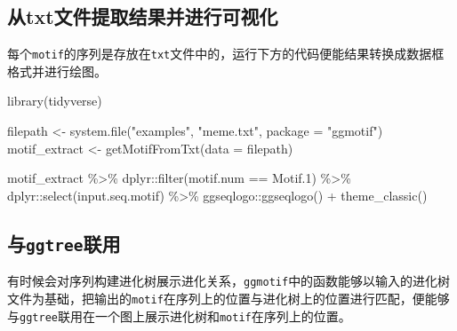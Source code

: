 \documentclass[
  10pt,
]{book}
\newenvironment{Shaded}{\begin{snugshade}}{\end{snugshade}}
\newcommand{\AttributeTok}[1]{\textcolor[rgb]{0.77,0.63,0.00}{#1}}
\newcommand{\FunctionTok}[1]{\textcolor[rgb]{0.00,0.00,0.00}{#1}}
\newcommand{\NormalTok}[1]{#1}
\newcommand{\OtherTok}[1]{\textcolor[rgb]{0.56,0.35,0.01}{#1}}
\newcommand{\SpecialCharTok}[1]{\textcolor[rgb]{0.00,0.00,0.00}{#1}}
\newcommand{\StringTok}[1]{\textcolor[rgb]{0.31,0.60,0.02}{#1}}
\begin{document}
\hypertarget{ux4ecetxtux6587ux4ef6ux63d0ux53d6ux7ed3ux679cux5e76ux8fdbux884cux53efux89c6ux5316}{%
\subsection{从txt文件提取结果并进行可视化}\label{ux4ecetxtux6587ux4ef6ux63d0ux53d6ux7ed3ux679cux5e76ux8fdbux884cux53efux89c6ux5316}}

每个\texttt{motif}的序列是存放在\texttt{txt}文件中的，运行下方的代码便能结果转换成数据框格式并进行绘图。

\begin{Shaded}
\begin{Highlighting}[]
\FunctionTok{library}\NormalTok{(tidyverse)}

\NormalTok{filepath }\OtherTok{\textless{}{-}} \FunctionTok{system.file}\NormalTok{(}\StringTok{"examples"}\NormalTok{, }\StringTok{"meme.txt"}\NormalTok{, }\AttributeTok{package =} \StringTok{"ggmotif"}\NormalTok{)}
\NormalTok{motif\_extract }\OtherTok{\textless{}{-}} \FunctionTok{getMotifFromTxt}\NormalTok{(}\AttributeTok{data =}\NormalTok{ filepath)}

\NormalTok{motif\_extract }\SpecialCharTok{\%\textgreater{}\%} 
\NormalTok{  dplyr}\SpecialCharTok{::}\FunctionTok{filter}\NormalTok{(motif.num }\SpecialCharTok{==} \StringTok{\textquotesingle{}Motif.1\textquotesingle{}}\NormalTok{) }\SpecialCharTok{\%\textgreater{}\%} 
\NormalTok{  dplyr}\SpecialCharTok{::}\FunctionTok{select}\NormalTok{(input.seq.motif) }\SpecialCharTok{\%\textgreater{}\%} 
\NormalTok{  ggseqlogo}\SpecialCharTok{::}\FunctionTok{ggseqlogo}\NormalTok{() }\SpecialCharTok{+}
  \FunctionTok{theme\_classic}\NormalTok{()}
\end{Highlighting}
\end{Shaded}

\hypertarget{ux4e0eggtreeux8054ux7528}{%
\subsection{\texorpdfstring{与\texttt{ggtree}联用}{与ggtree联用}}\label{ux4e0eggtreeux8054ux7528}}

有时候会对序列构建进化树展示进化关系，\texttt{ggmotif}中的函数能够以输入的进化树文件为基础，把输出的\texttt{motif}在序列上的位置与进化树上的位置进行匹配，便能够与\texttt{ggtree}联用在一个图上展示进化树和\texttt{motif}在序列上的位置。
\end{document}
